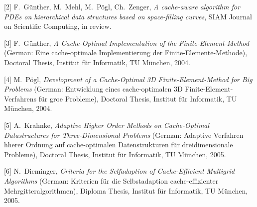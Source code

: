 \documentclass{report}
\begin{document}
[2] F.~G\"{u}nther, M.~Mehl, M.~P\"{o}gl, Ch.~Zenger,
{\em A cache-aware
algorithm for PDEs on hierarchical data structures based on
space-filling curves}, SIAM Journal on Scientific Computing,
in review.

[3] F.~G\"{u}nther,
{\em A Cache-Optimal Implementation of the
Finite-Element-Method} (German: Eine cache-optimale
Implementierung der Finite-Elemente-Methode), Doctoral
Thesis, Institut f\"{u}r Informatik, TU M\"{u}nchen, 2004.

[4] M.~P\"{o}gl,
{\em Development of a Cache-Optimal 3D
Finite-Element-Method for Big Problems} (German:
Entwicklung eines cache-optimalen 3D
Finite-Element-Verfahrens f\"{u}r groe Probleme),
Doctoral Thesis, Institut f\"{u}r Informatik, TU
M\"{u}nchen, 2004.

[5] A.~Krahnke,
{\em Adaptive Higher Order Methods on Cache-Optimal
Datastructures for Three-Dimensional Problems} (German:
Adaptive Verfahren hherer Ordnung auf cache-optimalen
Datenstrukturen f\"{u}r dreidimensionale Probleme),
Doctoral Thesis, Institut f\"{u}r Informatik, TU
M\"{u}nchen, 2005.

[6] N.~Dieminger,
{\em Criteria for the Selfadaption of
Cache-Efficient Multigrid Algorithms} (German: Kriterien
f\"{u}r die Selbstadaption cache-effizienter
Mehrgitteralgorithmen), Diploma Thesis, Institut f\"{u}r
Informatik, TU M\"{u}nchen, 2005.
\end{document}

